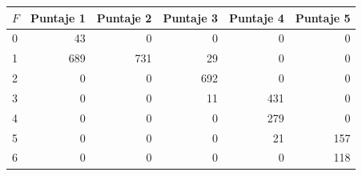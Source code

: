 \begin{tabular}{lrrrrr}
\toprule
$F$ & Puntaje 1 & Puntaje 2 & Puntaje 3 & Puntaje 4 & Puntaje 5 \\
\midrule
0 & 43 & 0 & 0 & 0 & 0 \\
1 & 689 & 731 & 29 & 0 & 0 \\
2 & 0 & 0 & 692 & 0 & 0 \\
3 & 0 & 0 & 11 & 431 & 0 \\
4 & 0 & 0 & 0 & 279 & 0 \\
5 & 0 & 0 & 0 & 21 & 157 \\
6 & 0 & 0 & 0 & 0 & 118 \\
\bottomrule
\end{tabular}
